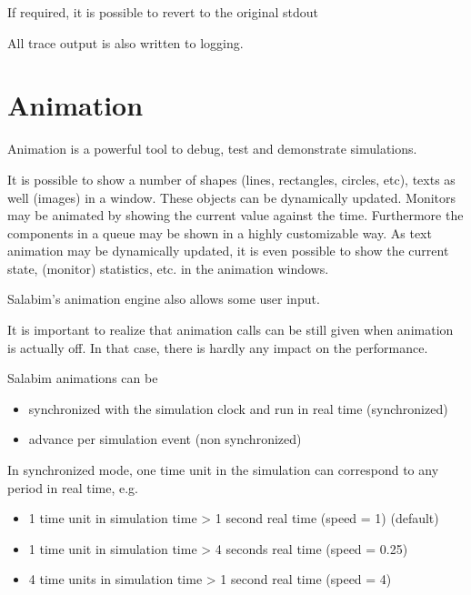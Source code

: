 \documentclass[letterpaper,10pt,english]{sphinxmanual}
\begin{document}
If required, it is possible to revert to the original stdout

%
\begin{sphinxVerbatim}[commandchars=\\\{\}]
  
\end{sphinxVerbatim}

All trace output is also written to logging.


\chapter{Animation}
\label{\detokenize{Animation:animation}}\label{\detokenize{Animation::doc}}
Animation is a powerful tool to debug, test and demonstrate simulations.

It is possible to show a number of shapes (lines, rectangles, circles, etc), texts as well (images) in a window. These objects can be dynamically updated.
Monitors may be animated by showing the current value against the time.
Furthermore the components in a queue may be shown in a highly customizable way.
As text animation may be dynamically updated, it is even possible to show the current state, (monitor) statistics, etc. in the animation windows.

Salabim’s animation engine also allows some user input.

It is important to realize that animation calls can be still given when animation is actually off. In that case, there is hardly any impact on the performance.

Salabim animations can be
\begin{itemize}
\item {} 
synchronized with the simulation clock and run in real time (synchronized)

\item {} 
advance per simulation event (non synchronized)

\end{itemize}

In synchronized mode, one time unit in the simulation can correspond to any period in real time, e.g.
\begin{itemize}
\item {} 
1 time unit in simulation time \textendash{}\textgreater{} 1 second real time (speed = 1) (default)

\item {} 
1 time unit in simulation time \textendash{}\textgreater{} 4 seconds real time (speed = 0.25)

\item {} 
4 time units in simulation time \textendash{}\textgreater{} 1 second real time (speed = 4)

\end{itemize}
\end{document}
